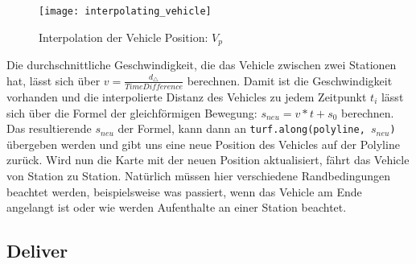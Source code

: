 \begin{newpage}
      \begin{figure}[htbp]
        \begin{center}
          \texttt{[image: interpolating\_vehicle]}
          \caption{Interpolation der Vehicle Position: $V_p$}
          \label{fig:interpolating_vehicle}
        \end{center}
      \end{figure}

      Die durchschnittliche Geschwindigkeit, die das Vehicle zwischen zwei Stationen hat, lässt sich über $v = \frac{d_\triangle}{TimeDifference}$ berechnen. Damit ist die Geschwindigkeit vorhanden und die interpolierte Distanz des Vehicles zu jedem Zeitpunkt $t_i$ lässt sich über die Formel der gleichförmigen Bewegung: $s_{neu} = v * t + s_0$ berechnen. Das resultierende $s_{neu}$ der Formel, kann dann an \texttt{turf.along(polyline, $s_{neu}$)} übergeben werden und gibt uns eine neue Position des Vehicles auf der Polyline zurück. Wird nun die Karte mit der neuen Position aktualisiert, fährt das Vehicle von Station zu Station. Natürlich müssen hier verschiedene Randbedingungen beachtet werden, beispielsweise was passiert, wenn das Vehicle am Ende angelangt ist oder wie werden Aufenthalte an einer Station beachtet.
      
      
      


    \subsection{Deliver}
    \label{sub:deliver}
      

    
\end{newpage}